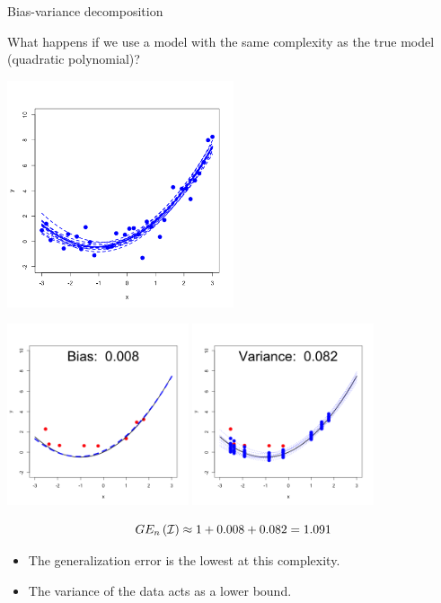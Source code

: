 \documentclass[11pt,compress,t,notes=noshow, xcolor=table]{beamer}
\begin{document}
\begin{vbframe} {Bias-variance decomposition}
\framebreak

What happens if we use a model with the same complexity as the true model (quadratic polynomial)? 

\begin{center}
  \includegraphics[width = 0.5\textwidth]{figure/bias_variance_decomposition-correct_model.png}
\end{center}

\framebreak

\begin{center}
  \includegraphics[width = 0.4\textwidth]{figure/bias_variance_decomposition-correct_model_bias.png}
  \includegraphics[width = 0.4\textwidth]{figure/bias_variance_decomposition-correct_model_variance.png}
\end{center}

$$GE_n\left(\mathcal{I}\right) \approx 1 + 0.008 + 0.082 = 1.091 $$

\begin{itemize}
  \item The generalization error is the lowest at this complexity.
  \item The variance of the data acts as a lower bound.
\end{itemize}
 

\end{vbframe}
\end{document}
